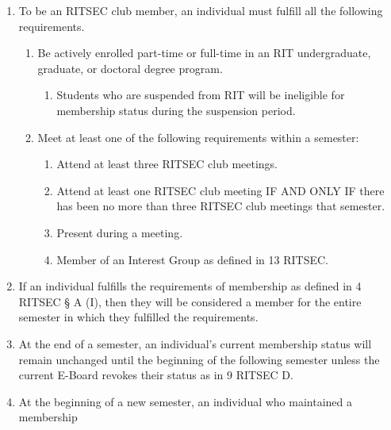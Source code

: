 


\begin{enumerate}
	\item To be an RITSEC club member, an individual must fulfill all the following
	      requirements.
	      \begin{enumerate}
		      \item Be actively enrolled part-time or full-time in an RIT undergraduate, graduate,
		            or doctoral degree program.
		            \begin{enumerate}
			            \item Students who are suspended from RIT will be ineligible for membership status
			                  during the suspension period.
		            \end{enumerate}
		      \item Meet at least one of the following requirements within a semester:
		            \begin{enumerate}
			            \item Attend at least three RITSEC club meetings.
			            \item Attend at least one RITSEC club meeting IF AND ONLY IF there has been no more
			                  than three RITSEC club meetings that semester.
			            \item Present during a meeting.
			            \item Member of an Interest Group as defined in 13 RITSEC\@.
		            \end{enumerate}
	      \end{enumerate}
	\item If an individual fulfills the requirements of membership as defined in 4 RITSEC
	      § A (I), then they will be considered a member for the entire semester in which
	      they fulfilled the requirements.
	\item At the end of a semester, an individual's current membership status will remain
	      unchanged until the beginning of the following semester unless the current
	      E-Board revokes their status as in 9 RITSEC D.
	\item At the beginning of a new semester, an individual who maintained a membership

\end{enumerate}
